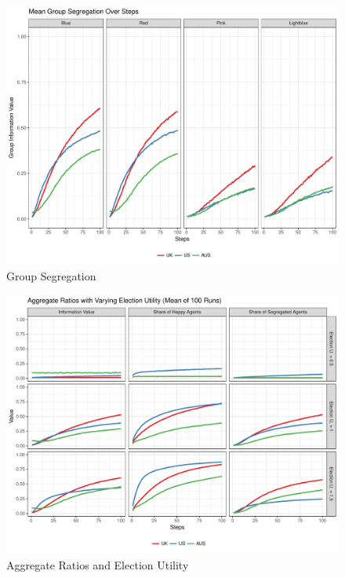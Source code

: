 \documentclass[12pt, a4paper]{article}
\begin{document}
\begin{figure}[bp!]
	\centering
	\caption{Group Segregation}
	\includegraphics[scale=0.6]{./Plots/grp_ratios.pdf}
\end{figure}

\begin{figure}[bp!]
	\centering
	\caption{Aggregate Ratios and Election Utility}
	\includegraphics[scale=0.6]{./Plots/el_agg_ratios.pdf}
\end{figure}
\end{document}
